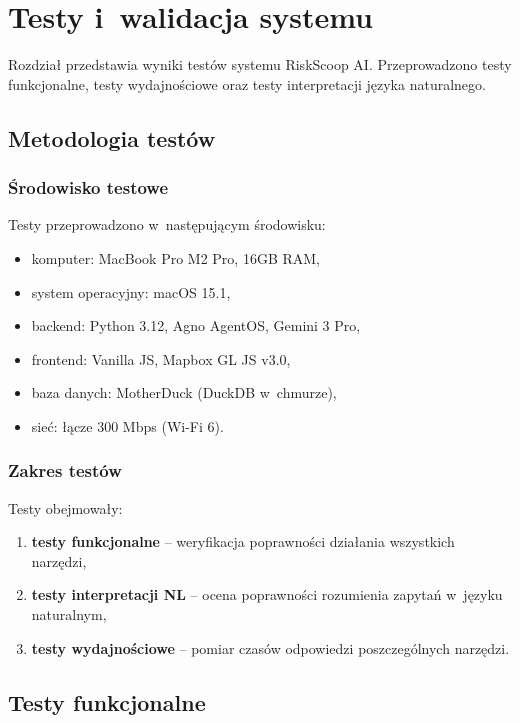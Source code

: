 \section{Testy i~walidacja systemu}
\label{chap:testy}

Rozdział przedstawia wyniki testów systemu RiskScoop AI. Przeprowadzono testy funkcjonalne, testy wydajnościowe oraz testy interpretacji języka naturalnego.

\subsection{Metodologia testów}

\subsubsection{Środowisko testowe}

Testy przeprowadzono w~następującym środowisku:
\begin{itemize}
    \item komputer: MacBook Pro M2 Pro, 16GB RAM,
    \item system operacyjny: macOS 15.1,
    \item backend: Python 3.12, Agno AgentOS, Gemini 3 Pro,
    \item frontend: Vanilla JS, Mapbox GL JS v3.0,
    \item baza danych: MotherDuck (DuckDB w~chmurze),
    \item sieć: łącze 300 Mbps (Wi-Fi 6).
\end{itemize}

\subsubsection{Zakres testów}

Testy obejmowały:
\begin{enumerate}
    \item \textbf{testy funkcjonalne} -- weryfikacja poprawności działania wszystkich narzędzi,
    \item \textbf{testy interpretacji NL} -- ocena poprawności rozumienia zapytań w~języku naturalnym,
    \item \textbf{testy wydajnościowe} -- pomiar czasów odpowiedzi poszczególnych narzędzi.
\end{enumerate}

\subsection{Testy funkcjonalne}

